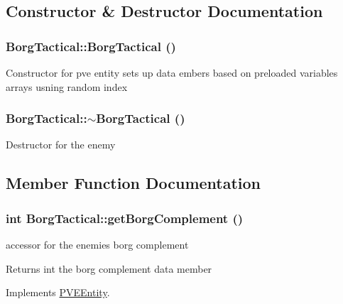 \subsection{Constructor \& Destructor Documentation}
\hypertarget{classBorgTactical_ac4cf305eefa102b5a09ad6f8c12276c2}{
\subsubsection[{BorgTactical}]{\setlength{\rightskip}{0pt plus 5cm}BorgTactical::BorgTactical ()}}
\label{d0/d4e/classBorgTactical_ac4cf305eefa102b5a09ad6f8c12276c2}
Constructor for pve entity sets up data embers based on preloaded variables arrays usning random index \hypertarget{classBorgTactical_a33dadcd0fdae2e7342f37b932ac153e2}{
\subsubsection[{$\sim$BorgTactical}]{\setlength{\rightskip}{0pt plus 5cm}BorgTactical::$\sim$BorgTactical ()}}
\label{d0/d4e/classBorgTactical_a33dadcd0fdae2e7342f37b932ac153e2}
Destructor for the enemy 

\subsection{Member Function Documentation}
\hypertarget{classBorgTactical_a71200942186755926d8314658eb06ad5}{
\subsubsection[{getBorgComplement}]{\setlength{\rightskip}{0pt plus 5cm}int BorgTactical::getBorgComplement ()}}
\label{d0/d4e/classBorgTactical_a71200942186755926d8314658eb06ad5}
accessor for the enemies borg complement

\begin{DoxyReturn}{Returns}
int the borg complement data member 
\end{DoxyReturn}


Implements \hyperlink{classPVEEntity}{PVEEntity}.

